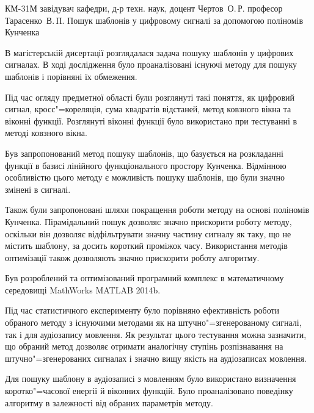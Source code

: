 \documentclass{thesis_utf8}
\begin{document}
    {КМ-31М}
    {завідувач кафедри, д-р техн. наук, доцент Чертов~О.\,Р.}
    {професор Тарасенко~В.\,П.}
    {Пошук шаблонів у цифровому сигналі за допомогою поліномів Кунченка}
\pagestyle{plain}

\tableofcontents









\conclusion{}
В магістерській дисертації розглядалася задача пошуку шаблонів у цифрових сигналах.
В ході дослідження було проаналізовані існуючі методу для пошуку шаблонів і порівняні їх обмеження.

Під час огляду предметної області були розглянуті такі поняття, як цифровий сигнал, кросс"=кореляція, сума квадратів
відстаней, метод ковзного вікна та віконні функції.
Розглянуті віконні функції було використано при тестуванні в методі ковзного вікна.

Був запропонований метод пошуку шаблонів, що базується на розкладанні функції в базисі лінійного функціонального
простору Кунченка.
Відмінною особливістю цього методу є можливість пошуку шаблонів, що були значно змінені в сигналі.

Також були запропоновані шляхи покращення роботи методу на основі поліномів Кунченка.
Пірамідальний пошук дозволяє значно прискорити роботу методу, оскільки він дозволяє відфільтрувати значну частину
сигналу як таку, що не містить шаблону, за досить короткий проміжок часу.
Використання методів оптимізації також дозволяють значно прискорити роботу алгоритму.

Був розроблений та оптимізований програмний комплекс в математичному середовищі MathWorks MATLAB 2014b.

Під час статистичного експерименту було порівняно ефективність роботи обраного методу з існуючими методами як на
штучно"=згенерованому сигналі, так і для аудіозапису мовлення.
Як результат цього тестування можна зазначити, що обраний метод дозволяє отримати аналогічну ступінь розпізнавання на
штучно"=згенерованих сигналах і значно вищу якість на аудіозаписах мовлення.

Для пошуку шаблону в аудіозаписі з мовленням було використано визначення коротко"=часової енергії й віконних функцій.
Було проаналізовано поведінку алгоритму в залежності від обраних параметрів методу.
\end{document}
